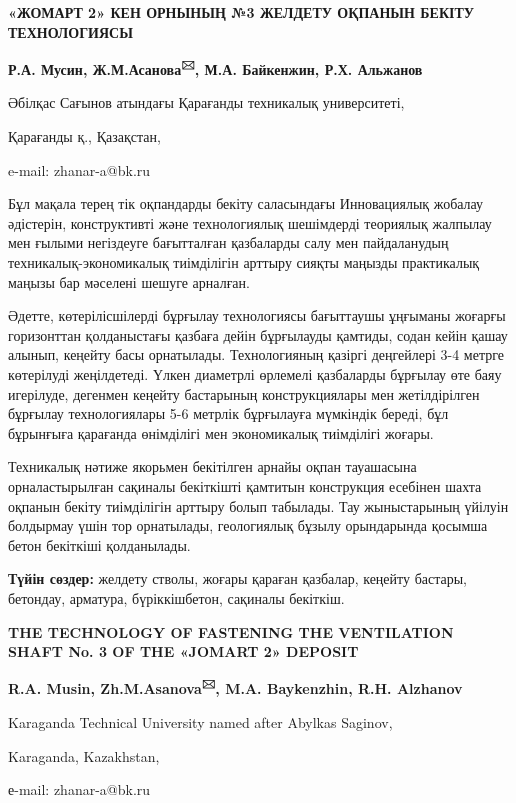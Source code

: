 \begin{center}
{\large\bfseries «ЖОМАРТ 2» КЕН ОРНЫНЫҢ №3 ЖЕЛДЕТУ ОҚПАНЫН БЕКІТУ ТЕХНОЛОГИЯСЫ}

{\bfseries Р.А. Мусин, Ж.М.Асанова\textsuperscript{🖂}, М.А. Байкенжин, Р.Х.
Альжанов}

Әбілқас Сағынов атындағы Қарағанды техникалық университеті,

Қарағанды қ., Қазақстан,

e-mail: zhanar-a@bk.ru
\end{center}

Бұл мақала терең тік оқпандарды бекіту саласындағы Инновациялық жобалау
әдістерін, конструктивті және технологиялық шешімдерді теориялық
жалпылау мен ғылыми негіздеуге бағытталған қазбаларды салу мен
пайдаланудың техникалық-экономикалық тиімділігін арттыру сияқты маңызды
практикалық маңызы бар мәселені шешуге арналған.

Әдетте, көтерілісшілерді бұрғылау технологиясы бағыттаушы ұңғыманы
жоғарғы горизонттан қолданыстағы қазбаға дейін бұрғылауды қамтиды, содан
кейін қашау алынып, кеңейту басы орнатылады. Технологияның қазіргі
деңгейлері 3-4 метрге көтерілуді жеңілдетеді. Үлкен диаметрлі өрлемелі
қазбаларды бұрғылау өте баяу игерілуде, дегенмен кеңейту бастарының
конструкциялары мен жетілдірілген бұрғылау технологиялары 5-6 метрлік
бұрғылауға мүмкіндік береді, бұл бұрынғыға қарағанда өнімділігі мен
экономикалық тиімділігі жоғары.

Техникалық нәтиже якорьмен бекітілген арнайы оқпан тауашасына
орналастырылған сақиналы бекіткішті қамтитын конструкция есебінен шахта
оқпанын бекіту тиімділігін арттыру болып табылады. Тау жыныстарының
үйілуін болдырмау үшін тор орнатылады, геологиялық бұзылу орындарында
қосымша бетон бекіткіші қолданылады.

{\bfseries Түйін сөздер:} желдету стволы, жоғары қараған қазбалар, кеңейту
бастары, бетондау, арматура, бүріккішбетон, сақиналы бекіткіш.

\begin{center}
{\large\bfseries THE TECHNOLOGY OF FASTENING THE VENTILATION SHAFT No. 3 OF THE «JOMART 2» DEPOSIT}

{\bfseries R.A. Musin, Zh.M.Asanova\textsuperscript{🖂}, M.A. Baykenzhin,
R.H. Alzhanov}

Karaganda Technical University named after Abylkas Saginov,

Karaganda, Kazakhstan,

е-mail: zhanar-a@bk.ru
\end{center}

